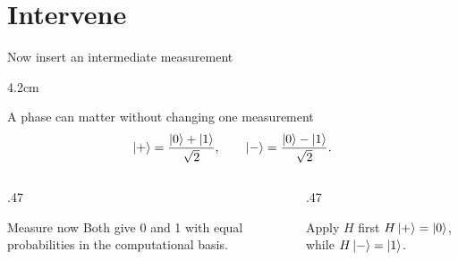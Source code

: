 \documentclass[12pt,aspectratio=43]{beamer}
\begin{document}
\section{Intervene}
\begin{frame}{Now insert an intermediate measurement}
\begin{overlayarea}{\textwidth}{4.2cm}
\end{overlayarea}
\end{frame}
\begin{frame}{A phase can matter without changing one measurement}
\[
 \ket{+}=\frac{\ket0+\ket1}{\sqrt2},\qquad
 \ket{-}=\frac{\ket0-\ket1}{\sqrt2}.
\]
\begin{columns}[T]
\begin{column}{.47\textwidth}\begin{block}{Measure now}
Both give 0 and 1 with equal probabilities in the computational basis.
\end{block}\end{column}
\begin{column}{.47\textwidth}\begin{block}{Apply $H$ first}
$H\ket{+}=\ket0$, while $H\ket{-}=\ket1$.
\end{block}\end{column}
\end{columns}
\end{frame}
\end{document}
